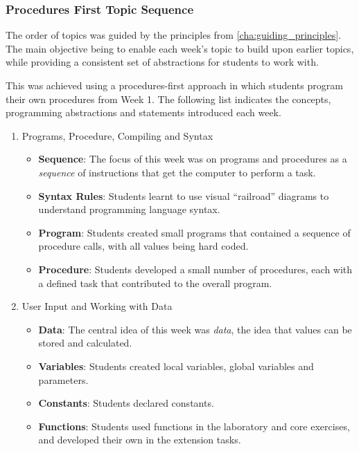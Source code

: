 \subsubsection{Procedures First Topic Sequence} %
\label{ssub:procedures_first_topic_sequence}

The order of topics was guided by the principles from \cref{cha:guiding_principles}. The main objective being to enable each week's topic to build upon earlier topics, while providing a consistent set of abstractions for students to work with.

This was achieved using a procedures-first approach in which students program their own procedures from Week 1. The following list indicates the concepts, programming abstractions and statements introduced each week.

\begin{enumerate}
  \item Programs, Procedure, Compiling and Syntax
  \begin{itemize}[noitemsep,nolistsep]
  	\item \textbf{Sequence}: The focus of this week was on programs and procedures as a \emph{sequence} of instructions that get the computer to perform a task.
  	\item \textbf{Syntax Rules}: Students learnt to use visual ``railroad'' diagrams \cite{Braz:1990} to understand programming language syntax.
  	\item \textbf{Program}: Students created small programs that contained a sequence of procedure calls, with all values being hard coded.
  	\item \textbf{Procedure}: Students developed a small number of procedures, each with a defined task that contributed to the overall program.
  \end{itemize}
  \item User Input and Working with Data
  \begin{itemize}[noitemsep,nolistsep]
  	\item \textbf{Data}: The central idea of this week was \emph{data}, the idea that values can be stored and calculated.
  	\item \textbf{Variables}: Students created local variables, global variables and parameters.
  	\item \textbf{Constants}: Students declared constants.
  	\item \textbf{Functions}: Students used functions in the laboratory and core exercises, and developed their own in the extension tasks.

\end{itemize}
\end{enumerate}
